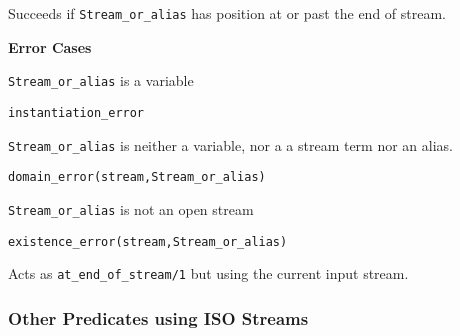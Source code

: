 \begin{description}
%
Succeeds if {\tt Stream\_or\_alias} has position at or past the end of
stream.

{\bf Error Cases}
\bi
\item 	{\tt Stream\_or\_alias} is a variable
\bi
\item {\tt instantiation\_error}
\ei
\item {\tt Stream\_or\_alias} is neither a variable, nor a a stream
  term nor an alias.  
\bi
\item 	{\tt domain\_error(stream,Stream\_or\_alias)}
\ei
\item 	{\tt Stream\_or\_alias} is not an open stream
\bi
\item 	{\tt existence\_error(stream,Stream\_or\_alias)}
\ei
\ei
%

%
Acts as {\tt at\_end\_of\_stream/1} but using the current input
stream.

\end{description}

\subsubsection{Other Predicates using ISO Streams}

